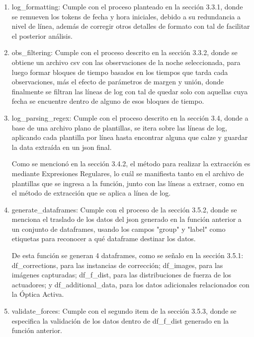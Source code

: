 \begin{enumerate}

    \item log\_formatting: Cumple con el proceso planteado en la sección 3.3.1, donde se remueven los tokens de fecha y hora iniciales, debido a su redundancia a nivel de línea, además de corregir otros detalles de formato con tal de facilitar el posterior análisis.

    \item obs\_filtering: Cumple con el proceso descrito en la sección 3.3.2, donde se obtiene un archivo csv con las observaciones de la noche seleccionada, para luego formar bloques de tiempo basados en los tiempos que tarda cada observaciones, más el efecto de parámetros de margen y unión, donde finalmente se filtran las líneas de log con tal de quedar solo con aquellas cuya fecha se encuentre dentro de alguno de esos bloques de tiempo.

    \item log\_parsing\_regex: Cumple con el proceso descrito en la sección 3.4, donde a base de una archivo plano de plantillas, se itera sobre las líneas de log, aplicando cada plantilla por línea hasta encontrar alguna que calze y guardar la data extraída en un json final.

    Como se mencionó en la sección 3.4.2, el método para realizar la extracción es mediante Expresiones Regulares, lo cuál se manifiesta tanto en el archivo de plantillas que se ingresa a la función, junto con las líneas a extraer, como en el método de extracción que se aplica a línea de log.

    \item generate\_dataframes: Cumple con el proceso de la sección 3.5.2, donde se menciona el traslado de los datos del json generado en la función anterior a un conjunto de dataframes, usando los campos "group" y "label" como etiquetas para reconocer a qué dataframe destinar los datos.

    De esta función se generan 4 dataframes, como se señalo en la sección 3.5.1: df\_corrections, para las instancias de corrección; df\_images, para las imágenes capturadas; df\_f\_dist, para las distribuciones de fuerza de los actuadores; y df\_additional\_data, para los datos adicionales relacionados con la Óptica Activa.

    \item validate\_forces: Cumple con el segundo item de la sección 3.5.3, donde se especifica la validación de los datos dentro de df\_f\_dist generado en la función anterior. 


\end{enumerate}
